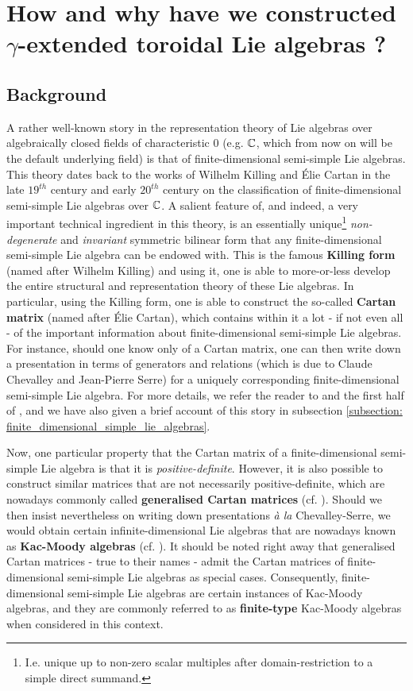 \section{How and why have we constructed \texorpdfstring{$\gamma$}{}-extended toroidal Lie algebras ?}
    \subsection{Background}
        A rather well-known story in the representation theory of Lie algebras over algebraically closed fields of characteristic $0$ (e.g. $\mathbb{C}$, which from now on will be the default underlying field) is that of finite-dimensional semi-simple Lie algebras. This theory dates back to the works of Wilhelm Killing and \'Elie Cartan in the late $19^{th}$ century and early $20^{th}$ century on the classification of finite-dimensional semi-simple Lie algebras over $\mathbb{C}$. A salient feature of, and indeed, a very important technical ingredient in this theory, is an essentially unique\footnote{I.e. unique up to non-zero scalar multiples after domain-restriction to a simple direct summand.} \textit{non-degenerate} and \textit{invariant} symmetric bilinear form that any finite-dimensional semi-simple Lie algebra can be endowed with. This is the famous \textbf{Killing form} (named after Wilhelm Killing) and using it, one is able to more-or-less develop the entire structural and representation theory of these Lie algebras. In particular, using the Killing form, one is able to construct the so-called \textbf{Cartan matrix} (named after \'Elie Cartan), which contains within it a lot - if not even all - of the important information about finite-dimensional semi-simple Lie algebras. For instance, should one know only of a Cartan matrix, one can then write down a presentation in terms of generators and relations (which is due to Claude Chevalley and Jean-Pierre Serre) for a uniquely corresponding finite-dimensional semi-simple Lie algebra. For more details, we refer the reader to \cite{humphreys_lie_algebras} and the first half of \cite{carter_affine_lie_algebras}, and we have also given a brief account of this story in subsection \ref{subsection: finite_dimensional_simple_lie_algebras}.

        Now, one particular property that the Cartan matrix of a finite-dimensional semi-simple Lie algebra is that it is \textit{positive-definite}. However, it is also possible to construct similar matrices that are not necessarily positive-definite, which are nowadays commonly called \textbf{generalised Cartan matrices} (cf. \cite[Chapter 1]{kac_infinite_dimensional_lie_algebras}). Should we then insist nevertheless on writing down presentations \textit{\`a la} Chevalley-Serre, we would obtain certain infinite-dimensional Lie algebras that are nowadays known as \textbf{Kac-Moody algebras} (cf. \cite[Chapter 1]{kac_infinite_dimensional_lie_algebras}). It should be noted right away that generalised Cartan matrices - true to their names - admit the Cartan matrices of finite-dimensional semi-simple Lie algebras as special cases. Consequently, finite-dimensional semi-simple Lie algebras are certain instances of Kac-Moody algebras, and they are commonly referred to as \textbf{finite-type} Kac-Moody algebras when considered in this context.
        
